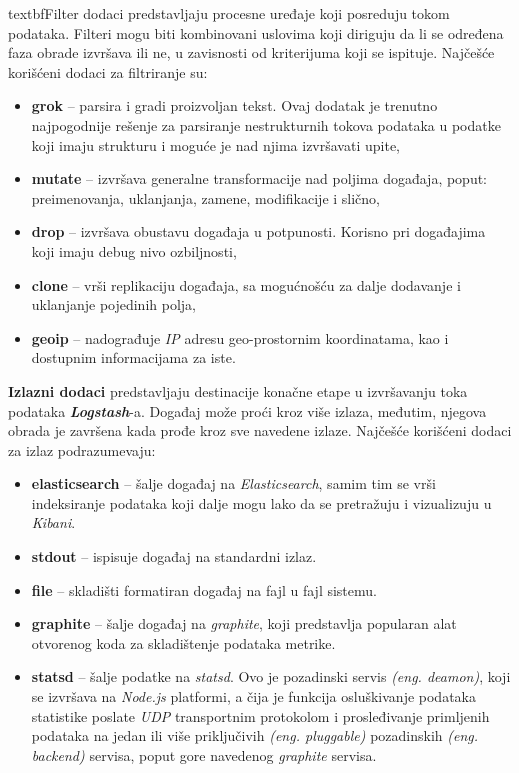 \par
textbf{Filter dodaci} predstavljaju procesne uređaje koji posreduju tokom podataka. Filteri mogu biti kombinovani uslovima koji diriguju da li se određena faza obrade izvršava ili ne, u zavisnosti od kriterijuma koji se ispituje. Najčešće korišćeni dodaci za filtriranje su:
\begin{itemize}
\item \textbf{grok} – parsira i gradi proizvoljan tekst. Ovaj dodatak je trenutno najpogodnije rešenje za parsiranje nestrukturnih tokova podataka u podatke koji imaju strukturu i moguće je nad njima izvršavati upite,
\item \textbf{mutate} – izvršava generalne transformacije nad poljima događaja, poput: preimenovanja, uklanjanja, zamene, modifikacije i slično,
\item \textbf{drop} – izvršava obustavu događaja u potpunosti. Korisno pri događajima koji imaju debug nivo ozbiljnosti,
\item \textbf{clone} – vrši replikaciju događaja, sa mogućnošću za dalje dodavanje i uklanjanje pojedinih polja,
\item \textbf{geoip} – nadograđuje \textit{IP} adresu geo-prostornim koordinatama, kao i dostupnim informacijama za iste.
\end{itemize}

\par
\textbf{Izlazni dodaci} predstavljaju destinacije konačne etape u izvršavanju toka podataka \textit{\textbf{Logstash}}-a. Događaj može proći kroz više izlaza, međutim, njegova obrada je završena kada prođe kroz sve navedene izlaze. Najčešće korišćeni dodaci za izlaz podrazumevaju:
\begin{itemize}
    \item \textbf{elasticsearch} – šalje događaj na \textit{Elasticsearch}, samim tim se vrši indeksiranje podataka koji dalje mogu lako da se pretražuju i vizualizuju u \textit{Kibani}.
    \item \textbf{stdout} – ispisuje događaj na standardni izlaz.
    \item \textbf{file} – skladišti formatiran događaj na fajl u fajl sistemu.
    \item \textbf{graphite} – šalje događaj na  \textit{graphite}, koji predstavlja popularan alat otvorenog koda za skladištenje podataka metrike. \cite{graphite}
    \item \textbf{statsd} – šalje podatke na  \textit{statsd}. Ovo je pozadinski servis  \textit{(eng. deamon)}, koji se izvršava na  \textit{Node.js} platformi, a čija je funkcija osluškivanje podataka statistike poslate  \textit{UDP} transportnim protokolom i prosleđivanje primljenih podataka na jedan ili više priključivih  \textit{(eng. pluggable)} pozadinskih  \textit{(eng. backend)} servisa, poput gore navedenog  \textit{graphite} servisa. \cite{statsd}
\end{itemize}

